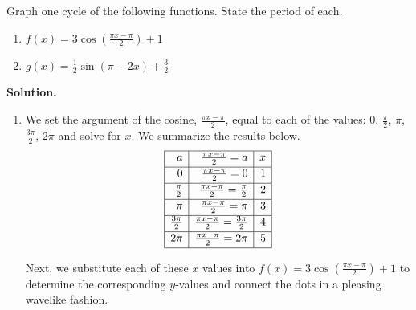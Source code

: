 \begin{ex}  \label{cosinesinegraphex1} Graph one cycle of the following functions. State the period of each.

\begin{multicols}{2}

\begin{enumerate}

\item  $f(x) = 3 \cos\left(\frac{\pi x - \pi}{2}\right) + 1$

\item  $g(x) = \frac{1}{2} \sin(\pi - 2x) + \frac{3}{2}$

\end{enumerate}

\end{multicols}

{\bf Solution.}

\begin{enumerate}

\item  We set the argument of the cosine, $\frac{\pi x - \pi}{2}$, equal to each of the values:  $0$, $\frac{\pi}{2}$, $\pi$, $\frac{3\pi}{2}$, $2\pi$ and solve for $x$. We summarize the results below.
\setlength{\extrarowheight}{2pt}
\[ \begin{array}{|r|r|r|}  

\hline

 a & \frac{\pi x - \pi}{2} = a & x \\ [2pt] \hline

0  & \frac{\pi x - \pi}{2} = 0 & 1 \\ [2pt]   \hline

\frac{\pi}{2}  & \frac{\pi x - \pi}{2} = \frac{\pi}{2} & 2 \\ [2pt] \hline 

\pi & \frac{\pi x - \pi}{2} = \pi & 3 \\ [2pt] \hline 

\frac{3\pi}{2}  & \frac{\pi x - \pi}{2} = \frac{3\pi}{2} & 4 \\ [2pt] \hline 

2\pi  & \frac{\pi x - \pi}{2} = 2\pi & 5\\  [2pt] \hline
\end{array} \]
\setlength{\extrarowheight}{0pt}

Next, we substitute each of these $x$ values into $f(x) = 3 \cos\left(\frac{\pi x - \pi}{2}\right) + 1$ to determine the corresponding $y$-values and connect the dots in a pleasing wavelike fashion. 



\end{enumerate}
\end{ex}
